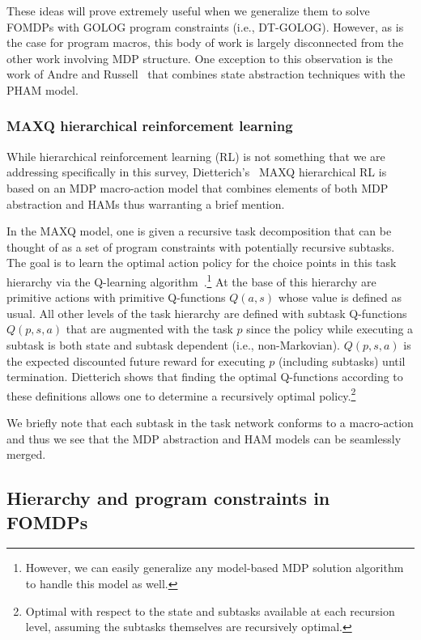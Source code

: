 These ideas will prove extremely useful when we generalize them to
solve FOMDPs with GOLOG program constraints (i.e., DT-GOLOG).  However,
as is the case for program macros, this body of work is largely disconnected
from the other work involving MDP structure.  One exception to
this observation is the work of Andre and Russell~\cite{pham2}
that combines state abstraction techniques with the PHAM model.

\subsubsection{MAXQ hierarchical reinforcement learning}

While hierarchical reinforcement learning (RL) is not something that
we are addressing specifically in this survey,
Dietterich's~\cite{maxq} MAXQ hierarchical RL is based on an MDP
macro-action model that combines elements of both MDP abstraction
and HAMs thus warranting a brief mention.

In the MAXQ model, one is given a recursive task decomposition that
can be thought of as a set of program constraints with potentially
recursive subtasks.  The goal is to learn the optimal action policy
for the choice points in this task hierarchy via the Q-learning
algorithm~\cite{RL}.\footnote{However, we can easily generalize any model-based
MDP solution algorithm to handle this model as well.}  At the base of
this hierarchy are primitive actions with primitive Q-functions
$Q(a,s)$ whose value is defined as usual.  All other levels of the
task hierarchy are defined with subtask Q-functions $Q(p,s,a)$ that are
augmented with the task $p$ since the policy while executing a subtask
is both state and subtask dependent (i.e., non-Markovian).  $Q(p,s,a)$ is the expected
discounted future reward for executing $p$ (including subtasks) until
termination.  Dietterich shows that finding the optimal Q-functions
according to these definitions
allows one to determine a recursively optimal policy.\footnote{Optimal
with respect to the state and subtasks available at each recursion
level, assuming the subtasks themselves are recursively optimal.}

We briefly note that each subtask in the task network conforms to
a macro-action and thus we see that the MDP abstraction and HAM models
can be seamlessly merged.

\subsection{Hierarchy and program constraints in FOMDPs}

